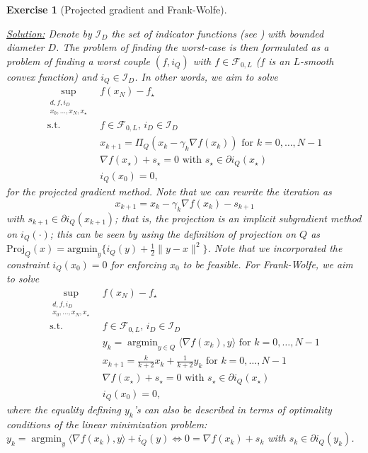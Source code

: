 \documentclass[11pt,a4paper]{article}
\newcommand{\inner}[2]{{\langle #1, #2\rangle}}
\DeclareMathOperator*{\argmin}{argmin}
\newcommand{\correction}[1]{{{\color{blue}\underline{Solution:} #1}}}
\newcommand{\correction}[1]{}
\newtheorem{exercise}{Exercise}
\begin{document}
\begin{exercise}[Projected gradient and Frank-Wolfe]
\begin{enumerate}
	\correction{Denote by $\mathcal{I}_D$ the set of indicator functions (see \Cref{def:indicator}) with bounded diameter $D$. The problem of finding the worst-case is then formulated as a problem of finding a worst couple $(f,i_Q)$ with $f\in\mathcal{F}_{0,L}$ ($f$ is an $L$-smooth convex function) and $i_Q\in\mathcal{I}_D$. In other words, we aim to solve 
	\begin{equation}\label{ex5:proj}
	\begin{aligned}
		\sup_{\substack{d,f,i_D\\x_0,\ldots,x_{N},x_\star}} \ &f(x_N)-f_\star\\
		\text{s.t. } & f\in\mathcal{F}_{0,L},\, i_D\in\mathcal{I}_D \\
		&x_{k+1}=\Pi_Q\left(x_k-\gamma_k  \nabla f(x_k)\right) \text{ for }k=0,\ldots,N-1\\
		&\nabla f(x_\star)+s_\star=0 \text{ with }s_\star\in\partial i_Q(x_\star)\\
		&i_Q(x_0)=0,
		\end{aligned}
	\end{equation} 
for the projected gradient method. Note that we can rewrite the iteration as \[x_{k+1}=x_k-\gamma_k  \nabla f(x_k)-s_{k+1}\] with $s_{k+1}\in\partial i_Q(x_{k+1})$; that is, the projection is an implicit subgradient method on $i_Q(\cdot)$; this can be seen by using the definition of projection on $Q$ as $\mathrm{Proj}_Q(x)=\mathrm{argmin}_y \{ i_Q(y)+\tfrac12 \|y-x\|^2\}$. Note that we incorporated the constraint $i_Q(x_0)=0$ for enforcing $x_0$ to be feasible. For Frank-Wolfe, we aim to solve
	\begin{equation}\label{ex5:FW}
	\begin{aligned}
		\sup_{\substack{d,f,i_D\\x_0,\ldots,x_{N},x_\star}} \ &f(x_N)-f_\star\\
		\text{s.t. } & f\in\mathcal{F}_{0,L},\, i_D\in\mathcal{I}_D \\
		& y_k = \argmin_{y\in Q} \inner{\nabla f(x_k)}{y} \text{ for }k=0,\ldots,N-1\\
	&x_{k+1} = \tfrac{k}{k+2} x_k + \tfrac{1}{k+2} y_k \text{ for }k=0,\ldots,N-1\\
		&\nabla f(x_\star)+s_\star=0 \text{ with }s_\star\in\partial i_Q(x_\star)\\
		&i_Q(x_0)=0,
		\end{aligned}
	\end{equation} 
	where the equality defining $y_k$'s can also be described in terms of optimality conditions of the linear minimization problem: $y_k = \argmin_{y} \inner{\nabla f(x_k)}{y}+i_Q(y) \Leftrightarrow 0=\nabla f(x_k)+s_k$ with $s_k\in\partial i_Q(y_k)$.
	
}
\end{enumerate}
\end{exercise}
\end{document}
